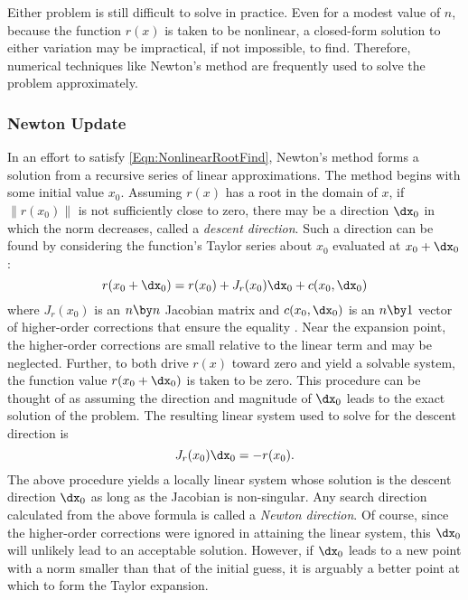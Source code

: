 Either problem is still difficult to solve in practice.
Even for a modest value of $n$, because the function $r(x)$ is taken to be nonlinear, a closed-form solution to either variation may be impractical, if not impossible, to find.
Therefore, numerical techniques like Newton's method are frequently used to solve the problem approximately.





\subsubsection{Newton Update}
In an effort to satisfy \cref{Eqn:NonlinearRootFind}, Newton's method forms a solution from a recursive series of linear approximations.
The method begins with some initial value $x_0$.
Assuming $r(x)$ has a root in the domain of $x$, if $\|r(x_0)\|$ is not sufficiently close to zero, there may be a direction $\dx_0$ in which the norm decreases, called a \textit{descent direction}.
Such a direction can be found by considering the function's Taylor series about $x_0$ evaluated at $x_0 + \dx_0$:
\begin{equation}
    r(x_0 + \dx_0) =  r(x_0) + J_r(x_0)\dx_0 + c(x_0,\dx_0)
\end{equation}
where $J_r(x_0)$ is an $n \by n$ Jacobian matrix and $c(x_0,\dx_0)$ is an $n \by 1$ vector of higher-order corrections that ensure the equality \cite{eriksson_applied_2003}.
Near the expansion point, the higher-order corrections are small relative to the linear term and may be neglected.
Further, to both drive $r(x)$ toward zero and yield a solvable system, the function value $r(x_0 + \dx_0)$ is taken to be zero.
This procedure can be thought of as assuming the direction and magnitude of $\dx_0$ leads to the exact solution of the problem.
The resulting linear system used to solve for the descent direction is
\begin{equation}
    J_{r}(x_0) \dx_0 = -r(x_0).
    \label{Eqn:NewtonsDirection}
\end{equation}
The above procedure yields a locally linear system whose solution is the descent direction $\dx_0$ as long as the Jacobian is non-singular.
Any search direction calculated from the above formula is called a \textit{Newton direction}.
Of course, since the higher-order corrections were ignored in attaining the linear system, this $\dx_0$ will unlikely lead to an acceptable solution.
However, if $\dx_0$ leads to a new point with a norm smaller than that of the initial guess, it is arguably a better point at which to form the Taylor expansion.

